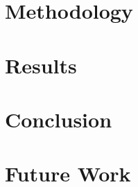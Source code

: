 



\onecolumn
\thispagestyle{empty}


\newpage


\newpage


\newpage


\newpage


\newpage


\newpage

\twocolumn



\section{Methodology}

\section{Results}

\section{Conclusion}

\section{Future Work}


\ifCLASSOPTIONcaptionsoff
    \newpage
\fi


\nocite{zheng2021continuousconditionalgenerativeadversarial}




